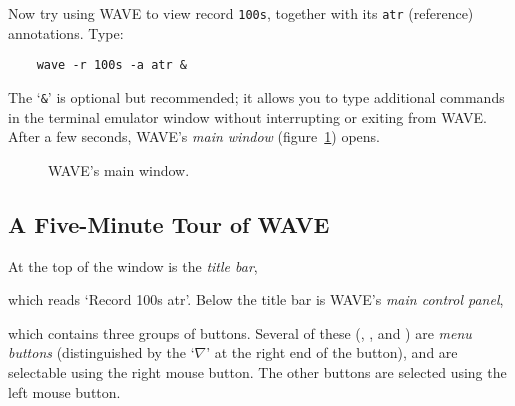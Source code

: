 \documentclass[twoside]{book}
\newcommand{\button}[1]{\cornersize{2}\ovalbox{\rule[-.3mm]{0cm}{2.5mm}\small\sf ~#1~}}
\newcommand{\menubutton}[1]{\button{#1~\ensuremath{\nabla}}}
\newcommand{\WAVE}{{\sf WAVE}\xspace}
\begin{document}
Now try using \WAVE{} to view record {\tt 100s}, together with its
{\tt atr} (reference) annotations.  Type:
\begin{verbatim}
    wave -r 100s -a atr &
\end{verbatim}
The `{\tt \&}' is optional but recommended; it allows you to type additional
commands in the terminal emulator window without interrupting or exiting from
\WAVE{}.  After a few seconds, \WAVE{}'s \emph{main window}
(figure~\ref{fig:main-window}) opens.
\begin{htmlonly}
\end{htmlonly}
\begin{latexonly}
\end{latexonly}
\begin{figure}
\centerline{}
\caption{\WAVE{}'s main window.}
\begin{htmlonly}
\end{htmlonly}
\begin{latexonly}
\end{latexonly}
\label{fig:main-window}
\end{figure}

\subsection*{A Five-Minute Tour of \WAVE{}}

At the top of the window is the \emph{title bar},
\begin{htmlonly}
\end{htmlonly}
\begin{latexonly}
\end{latexonly}
which reads `{\sf Record 100s atr}'.  Below the title bar is \WAVE{}'s
\emph{main control panel},
\begin{htmlonly}
\end{htmlonly}
\begin{latexonly}
\end{latexonly}
which contains three groups of buttons.  Several of these (\menubutton{File},
\menubutton{Edit}, and \menubutton{Properties}) are \emph{menu buttons}
(distinguished by the `$\nabla$' at the right end of the button), and are
selectable using the right mouse button.  The other buttons are selected using
the left mouse button.
\end{document}
